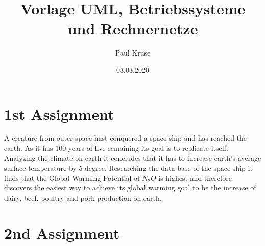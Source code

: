 \documentclass{Gharaei}
\title{Vorlage UML, Betriebssysteme und Rechnernetze}
\author{Paul Kruse}
\date{03.03.2020}
\begin{document}
\maketitle
\newpage
\thispagestyle{empty}
\tableofcontents
\setcounter{page}{1}
\newpage
\section{1st Assignment}
A creature from outer space hast conquered a space ship and has reached the earth. As it has 100 years of live remaining its goal is to replicate itself. Analyzing the climate on earth it concludes that it has to increase earth's average surface temperature by 5 degree. Researching the data base of the space ship it finds that the Global Warming Potential of $N_{2}O$ is highest and therefore discovers the easiest way to achieve its global warming goal to be the increase of dairy, beef, poultry and pork production on earth. %
\newpage
\section{2nd Assignment}
\end{document}
